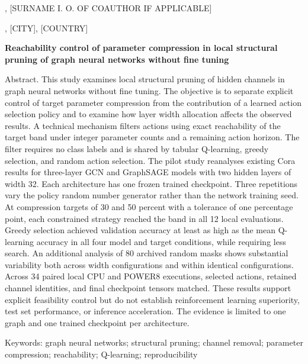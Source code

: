 \documentclass[10pt,a4paper]{article}
\begin{document}
, [SURNAME I. O. OF COAUTHOR IF APPLICABLE]\par
{}, [CITY], [COUNTRY]\par
\begin{center}\bfseries Reachability control of parameter compression in local structural pruning of graph neural networks without fine tuning\end{center}
\noindent Abstract. This study examines local structural pruning of hidden channels in graph neural networks without fine tuning. The objective is to separate explicit control of target parameter compression from the contribution of a learned action selection policy and to examine how layer width allocation affects the observed results. A technical mechanism filters actions using exact reachability of the target band under integer parameter counts and a remaining action horizon. The filter requires no class labels and is shared by tabular Q-learning, greedy selection, and random action selection. The pilot study reanalyses existing Cora results for three-layer GCN and GraphSAGE models with two hidden layers of width 32. Each architecture has one frozen trained checkpoint. Three repetitions vary the policy random number generator rather than the network training seed. At compression targets of 30 and 50 percent with a tolerance of one percentage point, each constrained strategy reached the band in all 12 local evaluations. Greedy selection achieved validation accuracy at least as high as the mean Q-learning accuracy in all four model and target conditions, while requiring less search. An additional analysis of 80 archived random masks shows substantial variability both across width configurations and within identical configurations. Across 34 paired local CPU and POWER8 executions, selected actions, retained channel identities, and final checkpoint tensors matched. These results support explicit feasibility control but do not establish reinforcement learning superiority, test set performance, or inference acceleration. The evidence is limited to one graph and one trained checkpoint per architecture.\par
\noindent Keywords: graph neural networks; structural pruning; channel removal; parameter compression; reachability; Q-learning; reproducibility\par
\clearpage
\end{document}
